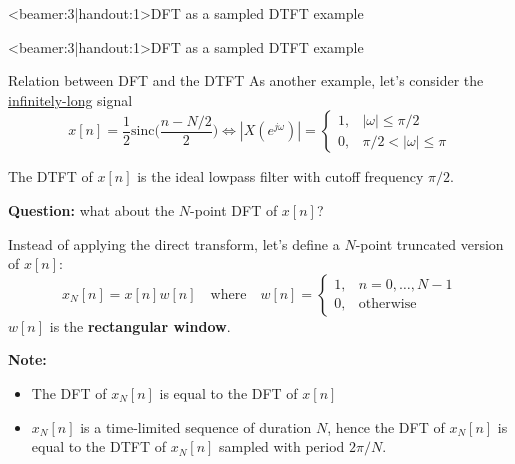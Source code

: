 \documentclass[10pt]{beamer}
\begin{document}
%
\begin{frame}<beamer:3|handout:1>{DFT as a sampled DTFT example}
\vspace{-0.7cm}
\begin{center}
	\def\N{3}
	\def\Ns{5}
	\resizebox{\linewidth}{!}{}
\end{center}
\end{frame}

%
\begin{frame}<beamer:3|handout:1>{DFT as a sampled DTFT example}
\vspace{-0.25cm}
\begin{center}
	\def\N{3}
	\def\Ns{4}
	\def\TIMEALIASING{1}
	\resizebox{\linewidth}{!}{}
\end{center}
\end{frame}

% 
\begin{frame}{Relation between DFT and the DTFT}
As another example, let's consider the \underline{infinitely-long} signal 
\begin{equation*}
x[n] = \frac{1}{2}\mathrm{sinc}\Big(\frac{n-N/2}{2}\Big) \Longleftrightarrow |X(e^{j\omega})| = \begin{cases}
1, & |\omega| \leq \pi/2 \\
0, & \pi/2 < |\omega|\leq\pi
\end{cases}
\end{equation*}

The DTFT of $x[n]$ is the ideal lowpass filter with cutoff frequency $\pi/2$.
\vspace{0.25cm}

\textbf{Question:} what about the $N$-point DFT of $x[n]$?
\pause

Instead of applying the direct transform, let's define a $N$-point truncated version of $x[n]$:
\begin{equation*}
x_N[n] = x[n]w[n] \quad\text{where}\quad w[n] = \begin{cases}
1, &n =0, \ldots, N-1 \\
0, &\text{otherwise}
\end{cases}
\end{equation*}
$w[n]$ is the \textbf{rectangular window}.

\textbf{Note:}
\begin{itemize}
	\item The DFT of $x_N[n]$ is equal to the DFT of $x[n]$
	\item $x_N[n]$ is a time-limited sequence of duration $N$, hence the DFT of $x_N[n]$ is equal to the DTFT of $x_N[n]$ sampled with period $2\pi/N$.
\end{itemize}
\end{frame}
\end{document}
